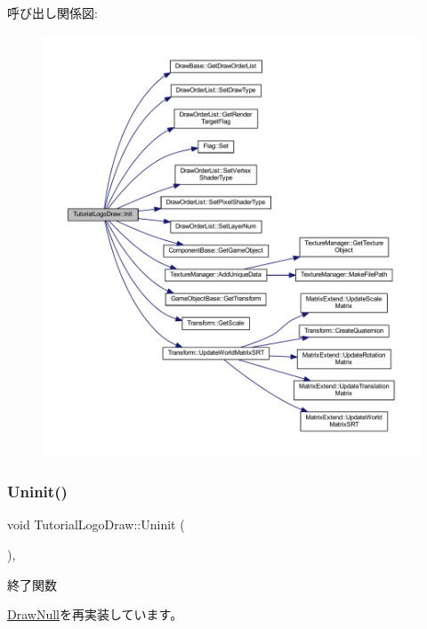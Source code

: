 呼び出し関係図\+:\nopagebreak
\begin{figure}[H]
\begin{center}
\leavevmode
\includegraphics[width=350pt]{class_tutorial_logo_draw_a53fc4b1b23c7f9e249600be67510f944_cgraph}
\end{center}
\end{figure}
\mbox{\label{class_tutorial_logo_draw_a949fb70954e3df28f87b8ed5c61bf8f1}} 
\subsubsection{\texorpdfstring{Uninit()}{Uninit()}}
{\footnotesize\ttfamily void Tutorial\+Logo\+Draw\+::\+Uninit (\begin{DoxyParamCaption}{ }\end{DoxyParamCaption})\hspace{0.3cm}{\ttfamily [override]}, {\ttfamily [virtual]}}



終了関数 



\mbox{\hyperlink{class_draw_null_a12d44e341c7364b5ab9cdd661dc16187}{Draw\+Null}}を再実装しています。



